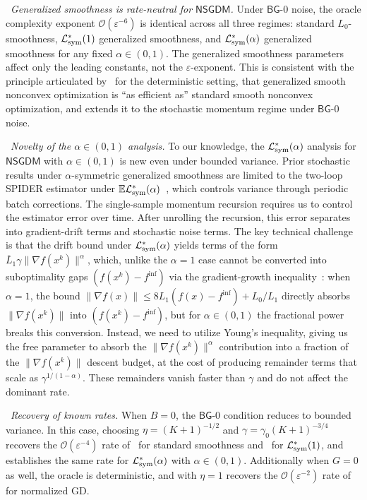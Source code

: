 \documentclass[letter,11pt]{article}
\newcommand{\E}{\mathbb{E}}
\newcommand{\Ocal}{\mathcal{O}}
\newcommand{\Lcal}{\mathcal{L}}
\begin{document}
\noindent \textbullet\  \textit{Generalized smoothness is rate-neutral for $\mathsf{NSGDM}$.}
Under $\mathsf{BG}$-0 noise, the oracle complexity exponent $\Ocal(\varepsilon^{-6})$ is identical across all three regimes: standard $L_0$-smoothness, $\Lcal_{\rm sym}^*(1)$ generalized smoothness, and $\Lcal_{\rm sym}^*(\alpha)$ generalized smoothness for any fixed $\alpha\in(0,1)$. The generalized smoothness parameters affect only the leading constants, not the $\varepsilon$-exponent. This is consistent with the principle articulated by~\citet{chen2023generalized} for the deterministic setting, that generalized smooth nonconvex optimization is ``as efficient as'' standard smooth nonconvex optimization, and extends it to the stochastic momentum regime under $\mathsf{BG}$-0 noise.

\noindent \textbullet\  \textit{Novelty of the $\alpha\in(0,1)$ analysis.}
To our knowledge, the $\Lcal_{\rm sym}^*(\alpha)$ analysis for $\mathsf{NSGDM}$ with $\alpha\in(0,1)$ is new even under bounded variance. Prior stochastic results under $\alpha$-symmetric generalized
smoothness are limited to the two-loop SPIDER estimator under $\E\Lcal_{\rm sym}^* (\alpha)$~\cite{chen2023generalized}, which controls variance through periodic batch corrections. The single-sample momentum recursion requires us to control the estimator error over time. After unrolling the recursion, this error separates into gradient-drift terms and stochastic noise terms. The key technical challenge is that the drift bound under $\Lcal_{\rm sym}^*(\alpha)$ yields terms of the form $\overline L_1 \gamma\|\nabla f(x^k)\|^\alpha$, which, unlike the $\alpha=1$ case cannot be converted into suboptimality gaps $(f(x^k)-f^{\inf})$ via the gradient-growth
inequality~\cite{chen2023generalized,khirirat2026error}: when $\alpha=1$, the bound $\|\nabla f(x)\|\le 8L_1(f(x)-f^{\inf})+L_0/L_1$ directly absorbs $\|\nabla f(x^k)\|$ into $(f(x^k)-f^{\inf})$, but for $\alpha\in(0,1)$ the fractional power breaks this conversion. Instead, we need to utilize Young's inequality, giving us the free parameter to absorb the $\|\nabla f(x^k)\|^\alpha$ contribution into a fraction of the $\|\nabla f(x^k)\|$ descent budget, at the cost of producing remainder terms that scale as $\gamma^{1/(1-\alpha)}$. These remainders vanish faster than $\gamma$ and do not affect the dominant rate.

\noindent \textbullet\  \textit{Recovery of known rates.}
When $B=0$, the $\mathsf{BG}$-0 condition reduces to bounded variance. In this case, choosing $\eta=(K+1)^{-1/2}$ and $\gamma=\gamma_0(K+1)^{-3/4}$ recovers the $\Ocal(\varepsilon^{-4})$ rate of~\citet{cutkosky2020momentum} for standard smoothness and~\citet{khirirat2026error} for $\Lcal_{\rm sym}^*(1)$, and establishes the same rate for $\Lcal_{\rm sym}^*(\alpha)$ with $\alpha\in(0,1)$. Additionally when $G=0$ as well, the oracle is deterministic, and with $\eta=1$ recovers the $\Ocal(\varepsilon^{-2})$ rate of~\citet{chen2023generalized} for normalized GD.
\end{document}

